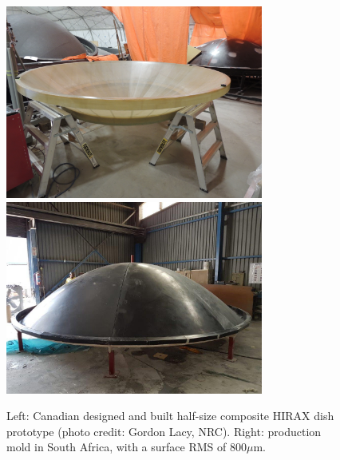 \documentclass[letterpaper,11pt,preprint]{aastex}
\begin{document}

\begin{figure}[t]
  \includegraphics[height=2.5in]{3m_dish.jpg}
  \includegraphics[height=2.5in]{mms_mold.jpg}
\caption{\small Left:  Canadian designed and built half-size composite
  HIRAX dish prototype (photo credit: Gordon Lacy, NRC).
  Right: production mold in South Africa, with a
  surface RMS of 800$\mu$m.
  \label{fig:hirax_dishes}
}
\end{figure}
\end{document}
